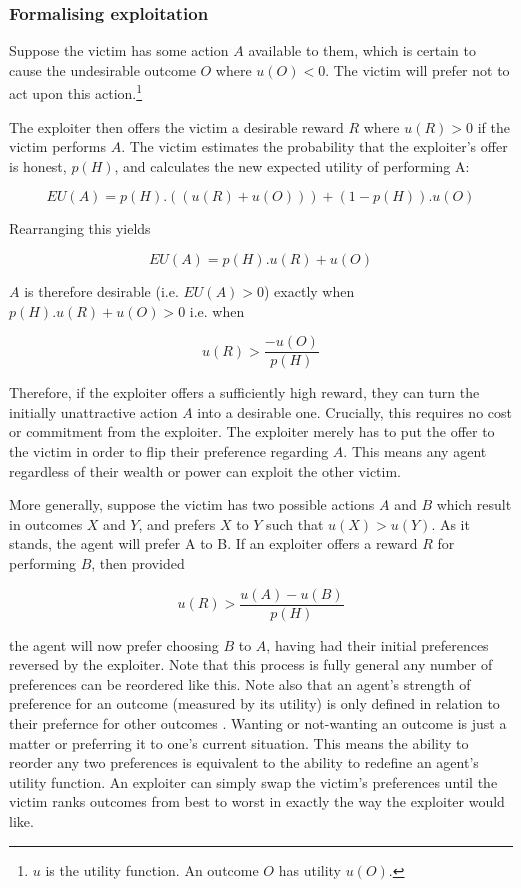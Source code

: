 \documentclass{article}
\begin{document}
\subsubsection{Formalising exploitation}

Suppose the victim has some action \(A\) available to them, which is certain to cause the undesirable outcome \(O\) where \(u(O) < 0\). The victim will prefer not to act upon this action.\footnote{\(u\) is the utility function. An outcome \(O\) has utility \(u(O)\).}

The exploiter then offers the victim a desirable reward \(R\) where \(u(R) > 0\) if the victim performs \(A\). The victim estimates the probability that the exploiter's offer is honest, \(p(H)\), and calculates the new expected utility of performing A:

\[EU(A) = p(H).((u(R)+u(O))) + (1-p(H)).u(O)\]

\noindent
Rearranging this yields

\[EU(A) = p(H).u(R) + u(O)\]

\noindent
\(A\) is therefore desirable (i.e. \(EU(A)>0\)) exactly when \(p(H).u(R) + u(O) > 0\) i.e. when

\[u(R) > \frac{-u(O)}{p(H)}\]

\noindent
Therefore, if the exploiter offers a sufficiently high reward, they can turn the initially unattractive action \(A\) into a desirable one. Crucially, this requires no cost or commitment from the exploiter. The exploiter merely has to put the offer to the victim in order to flip their preference regarding \(A\). This means any agent regardless of their wealth or power can exploit the other victim.

More generally, suppose the victim has two possible actions \(A\) and \(B\) which result in outcomes \(X\) and \(Y\), and prefers \(X\) to \(Y\) such that \(u(X)>u(Y)\). As it stands, the agent will prefer A to B. If an exploiter offers a reward \(R\) for performing \(B\), then provided

\[u(R) > \frac{u(A)-u(B)}{p(H)}\]

\noindent
the agent will now prefer choosing \(B\) to \(A\), having had their initial preferences reversed by the exploiter. Note that this process is fully general \textemdash{} any number of preferences can be reordered like this. Note also that an agent's strength of preference for an outcome (measured by its utility) is only defined in relation to their prefernce for other outcomes \citep{von1944games}. Wanting or not-wanting an outcome is just a matter or preferring it to one's current situation. This means the ability to reorder any two preferences is equivalent to the ability to redefine an agent's utility function. An exploiter can simply swap the victim's preferences until the victim ranks outcomes from best to worst in exactly the way the exploiter would like.
\end{document}
